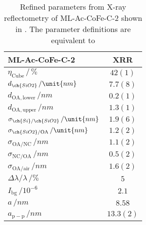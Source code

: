 \documentclass[\main/dresen_thesis.tex]{subfiles}
\begin{document}
  \begin{table}[!htbp]
    \centering
    \caption{\label{tab:monolayers:structure:squareArrayParacrystal:XRR}Refined parameters from X-ray reflectometry of ML-Ac-CoFe-C-2 shown in . The parameter definitions are equivalent to }
    \begin{tabular}{l | c}
      \hline
      ML-Ac-CoFe-C-2 & \textbf{XRR}\\
      \hline
      $\eta_\mathrm{Cube} \, /\, \%$                  & $42(1)$ \\
      $d_{\ch{SiO2}} \, / \unit{nm}$                  & $7.7(8)$ \\
      $d_{\mathrm{OA, lower}}\, / \unit{nm}$          & $0.2(1)$\\
      $d_{\mathrm{OA, upper}}\, / \unit{nm}$          & $1.3(1)$ \\
      $\sigma_{\ch{Si}/\ch{SiO2}} \, / \unit{nm}$     & $1.9(6)$ \\
      $\sigma_{\ch{SiO2}/\mathrm{OA}}\, / \unit{nm}$  & $1.2(2)$ \\
      $\sigma_\mathrm{OA/NC} \, / \unit{nm}$          & $1.1(2)$ \\
      $\sigma_\mathrm{NC/OA} \, / \unit{nm}$          & $0.5(2)$ \\
      $\sigma_\mathrm{OA/air} \, / \unit{nm}$         & $1.6(2)$ \\
      \hline
      $\Delta \lambda / \lambda\, / \unit{\%}$        & $5$ \\
      $I_\mathrm{bg} \, / \unit{10^{-6}}$             & $2.1$\\
      \hline
      $a \, / \unit{nm}$ & $8.58$ \\
      \hline
      $a_\mathrm{p-p} \, / \unit{nm}$ & $13.3(2)$ \\
      \hline
    \end{tabular}
  \end{table}
\end{document}
